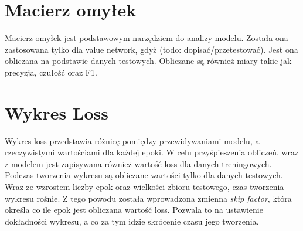 \section*{Macierz omyłek}
Macierz omyłek jest podstawowym narzędziem do analizy modelu. Została ona zastosowana tylko dla value network, gdyż (todo: dopisać/przetestować). Jest ona obliczana na podstawie danych testowych. Obliczane są również miary takie jak precyzja, czułość oraz F1.


\section*{Wykres Loss}
Wykres loss przedstawia różnicę pomiędzy przewidywaniami modelu, a rzeczywistymi wartościami dla każdej epoki. W celu przyśpieszenia obliczeń, wraz z modelem jest zapisywana również wartość loss dla danych treningowych. Podczas tworzenia wykresu są obliczane wartości tylko dla danych testowych. Wraz ze wzrostem liczby epok oraz wielkości zbioru testowego, czas tworzenia wykresu rośnie. Z tego powodu została wprowadzona zmienna \textit{skip factor}, która określa co ile epok jest obliczana wartość loss. Pozwala to na ustawienie dokładności wykresu, a co za tym idzie skrócenie czasu jego tworzenia.